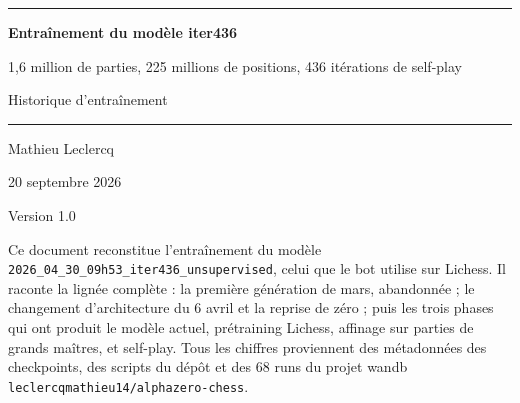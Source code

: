 \documentclass[11pt,a4paper]{article}
\newcommand{\code}[1]{\texttt{\small #1}}
\newcommand{\docTitre}{Entraînement du modèle iter436}
\newcommand{\docSousTitre}{1,6 million de parties, 225 millions de positions,
436 itérations de self-play}
\newcommand{\docAuteur}{Mathieu Leclercq}
\newcommand{\docDate}{20 septembre 2026}
\newcommand{\docVersion}{Version 1.0}
\begin{document}
\begin{titlepage}
\centering
\vspace*{1.5cm}
{\color{bleu}\rule{\textwidth}{1.2pt}}
\vspace{0.8cm}

{\Huge\bfseries\color{bleu} \docTitre\par}
\vspace{0.5cm}
{\Large\color{gris} \docSousTitre\par}

\vspace{0.6cm}
{\large Historique d'entraînement\par}

\vspace{0.4cm}
{\color{bleu}\rule{\textwidth}{0.6pt}}
\vspace{1.2cm}

{\large \docAuteur\par}
{\large \docDate\par}
\vspace{0.3cm}
{\small \docVersion\par}

\vfill

\begin{tcolorbox}[enhanced, colback=grisfond, colframe=gris!50,
  boxrule=0.5pt, arc=2pt, width=0.88\textwidth]
\small
Ce document reconstitue l'entraînement du modèle
\code{2026\_04\_30\_09h53\_iter436\_unsupervised}, celui que le bot utilise
sur Lichess. Il raconte la lignée complète : la première génération de mars,
abandonnée ; le changement d'architecture du 6 avril et la reprise de zéro ;
puis les trois phases qui ont produit le modèle actuel, prétraining Lichess,
affinage sur parties de grands maîtres, et self-play. Tous les chiffres
proviennent des métadonnées des checkpoints, des scripts du dépôt et des
68 runs du projet wandb \code{leclercqmathieu14/alphazero-chess}.
\end{tcolorbox}
\vspace{1cm}
\end{titlepage}

\tableofcontents
\newpage








\appendix


\end{document}

